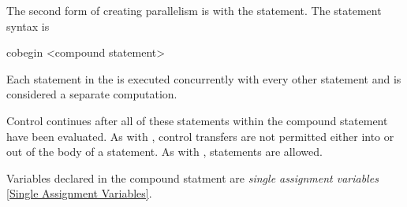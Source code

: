 The second form of creating parallelism is with the 
statement. The  statement syntax is
\begin{chapel}
cobegin <compound statement> 
\end{chapel}
Each statement in the  is executed 
concurrently with every other statement and is considered a separate 
computation.

Control continues after all of these statements within the compound
statement have been evaluated. As with , control
transfers are not permitted either into or out of the body of a
 statement. As with , 
statements are allowed.

Variables declared in the  compound statment are {\em single
assignment variables} \ref{Single Assignment Variables}. 
